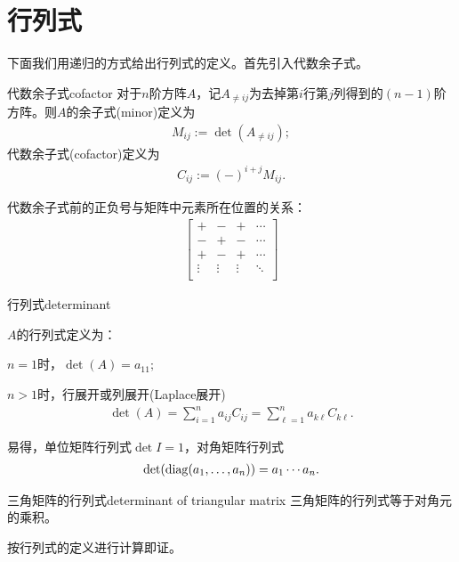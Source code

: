 \section{行列式}
下面我们用递归的方式给出行列式的定义。首先引入代数余子式。
\begin{definition}{代数余子式}{cofactor}
	对于$n$阶方阵$A$，记$A_{\neq ij}$为去掉第$i$行第$j$列得到的$(n-1)$阶方阵。则$A$的余子式(minor)定义为
	\begin{align}
		M_{ij}:=\det (A_{\neq ij});
	\end{align}
	代数余子式(cofactor)定义为
	\begin{align}
		C_{ij}:=(-)^{i+j}M_{ij}.
	\end{align}
\end{definition}
代数余子式前的正负号与矩阵中元素所在位置的关系：
\begin{align}
	\begin{bmatrix}
		+&-&+&\cdots\\
		-&+&-&\cdots\\
		+&-&+&\cdots\\
		\vdots&\vdots&\vdots&\ddots\\
	\end{bmatrix}
\end{align}
\begin{definition}{行列式}{determinant}
	
	$A$的行列式定义为：
	\begin{compactenum}
		\item $n=1$时，$\det (A)=a_{11};$
		\item $n>1$时，行展开或列展开(Laplace展开)
		\begin{align}
			\det (A) = \sum_{i=1}^na_{ij}C_{ij} = \sum_{\ell=1}^na_{k\ell}C_{k\ell}.
		\end{align}
	\end{compactenum}
\end{definition}
易得，单位矩阵行列式$\det I=1$，对角矩阵行列式
\begin{align}
	\det(\operatorname{diag}(a_1,\ldots,a_n))=a_1\cdots a_n.
\end{align}
\begin{theorem}{三角矩阵的行列式}{determinant of triangular matrix}
	三角矩阵的行列式等于对角元的乘积。
\end{theorem}
按行列式的定义进行计算即证。
